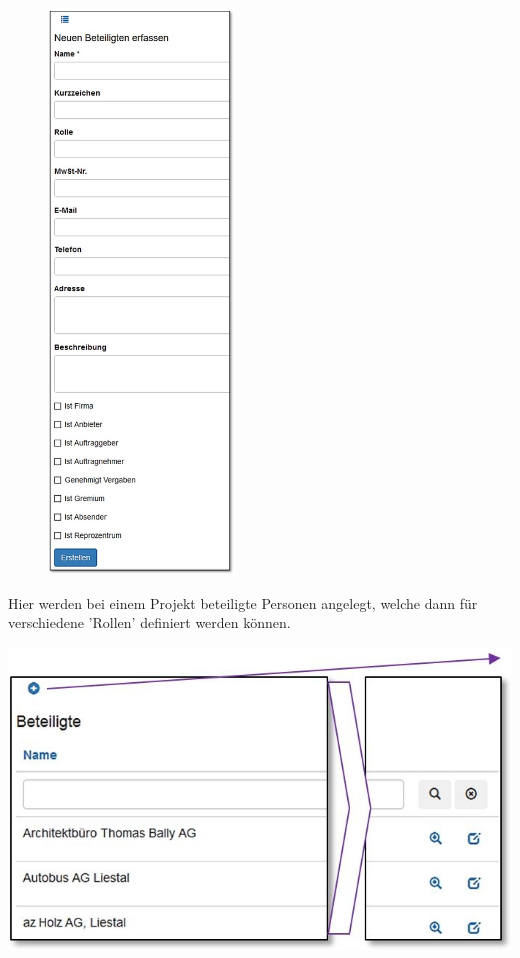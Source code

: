 \begin{figure}
\vspace{-45pt}
\includegraphics[height=150mm]{../chapters/13_Konfigurationen/pictures/konf_BeteiligteErfassen.jpg}
\end{figure}

Hier werden bei einem Projekt beteiligte Personen angelegt, welche dann für verschiedene 'Rollen' definiert werden können.

\begin{center}
\hspace{-15pt}   
\includegraphics[width=.9\linewidth]{../chapters/13_Konfigurationen/pictures/13-4_Beteiligte.jpg}
\end{center}


